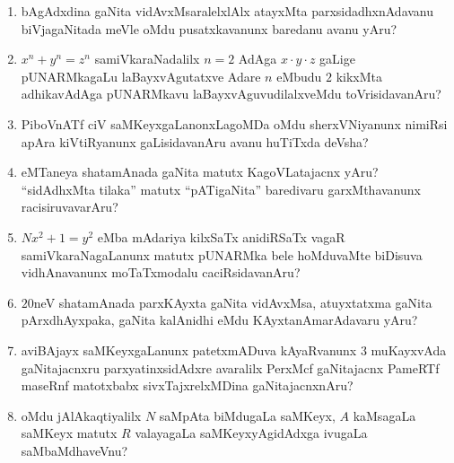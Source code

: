 \begin{enumerate}
\item bAgAdxdina gaNita vidAvxMsaralelxlAlx atayxMta parxsidadhxnAdavanu biVjagaNitada meVle oMdu pusatxkavanunx baredanu avanu yAru?

\item $x^n+y^n=z^n$ samiVkaraNadalilx $n=2$ AdAga $x \cdot y \cdot z$ gaLige pUNARMkagaLu laBayxvAgutatxve Adare $n$ eMbudu $2$ kikxMta adhikavAdAga pUNARMkavu laBayxvAguvudilalxveMdu toVrisidavanAru?

\item PiboVnATf ciV saMKeyxgaLanonxLagoMDa oMdu sherxVNiyanunx nimiRsi apAra kiVtiRyanunx gaLisidavanAru avanu huTiTxda deVsha?

\item eMTaneya shatamAnada gaNita matutx  KagoVLatajacnx yAru? ``sidAdhxMta tilaka'' matutx ``pATigaNita'' baredivaru garxMthavanunx racisiruvavarAru?

\item $Nx^2 +1=y^2$ eMba mAdariya kilxSaTx anidiRSaTx vagaR samiVkaraNagaLanunx matutx pUNARMka bele hoMduvaMte biDisuva vidhAnavanunx moTaTxmodalu caciRsidavanAru?

\item $20$neV shatamAnada parxKAyxta gaNita vidAvxMsa, atuyxtatxma gaNita pArxdhAyxpaka, gaNita kalAnidhi eMdu KAyxtanAmarAdavaru yAru?

\item aviBAjayx saMKeyxgaLanunx patetxmADuva kAyaRvanunx $3$ muKayxvAda gaNitajacnxru parxyatinxsidAdxre avaralilx PerxMcf gaNitajacnx PameRTf maseRnf matotxbabx sivxTajxrelxMDina gaNitajacnxnAru?

\item oMdu jAlAkaqtiyalilx $N$ saMpAta biMdugaLa saMKeyx, $A$ kaMsagaLa saMKeyx matutx $R$ valayagaLa saMKeyxyAgidAdxga ivugaLa saMbaMdhaveVnu?
  
\end{enumerate}
